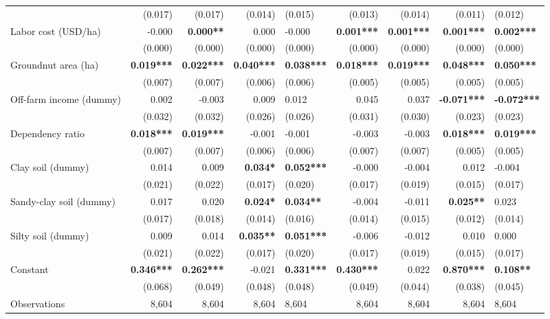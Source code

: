 \documentclass[
]{article}
\begin{document}
\begin{landscape}
\begin{longtable}[t]{lrrrlrrrl}
 & (0.017) & (0.017) & (0.014) & (0.015) & (0.013) & (0.014) & (0.011) & (0.012)\\
Labor cost (USD/ha) & -0.000 & \textbf{0.000**} & 0.000 & -0.000 & \textbf{0.001***} & \textbf{0.001***} & \textbf{0.001***} & \textbf{0.002***}\\
 & (0.000) & (0.000) & (0.000) & (0.000) & (0.000) & (0.000) & (0.000) & (0.000)\\
Groundnut area (ha) & \textbf{0.019***} & \textbf{0.022***} & \textbf{0.040***} & \textbf{0.038***} & \textbf{0.018***} & \textbf{0.019***} & \textbf{0.048***} & \textbf{0.050***}\\
 & (0.007) & (0.007) & (0.006) & (0.006) & (0.005) & (0.005) & (0.005) & (0.005)\\
\addlinespace
Off-farm income (dummy) & 0.002 & -0.003 & 0.009 & 0.012 & 0.045 & 0.037 & \textbf{-0.071***} & \textbf{-0.072***}\\
 & (0.032) & (0.032) & (0.026) & (0.026) & (0.031) & (0.030) & (0.023) & (0.023)\\
Dependency ratio & \textbf{0.018***} & \textbf{0.019***} & -0.001 & -0.001 & -0.003 & -0.003 & \textbf{0.018***} & \textbf{0.019***}\\
 & (0.007) & (0.007) & (0.006) & (0.006) & (0.007) & (0.007) & (0.005) & (0.005)\\
Clay soil (dummy) & 0.014 & 0.009 & \textbf{0.034*} & \textbf{0.052***} & -0.000 & -0.004 & 0.012 & -0.004\\
\addlinespace
 & (0.021) & (0.022) & (0.017) & (0.020) & (0.017) & (0.019) & (0.015) & \vphantom{1} (0.017)\\
Sandy-clay soil (dummy) & 0.017 & 0.020 & \textbf{0.024*} & \textbf{0.034**} & -0.004 & -0.011 & \textbf{0.025**} & 0.023\\
 & (0.017) & (0.018) & (0.014) & (0.016) & (0.014) & (0.015) & (0.012) & (0.014)\\
Silty soil (dummy) & 0.009 & 0.014 & \textbf{0.035**} & \textbf{0.051***} & -0.006 & -0.012 & 0.010 & 0.000\\
 & (0.021) & (0.022) & (0.017) & (0.020) & (0.017) & (0.019) & (0.015) & (0.017)\\
\addlinespace
Constant & \textbf{0.346***} & \textbf{0.262***} & -0.021 & \textbf{0.331***} & \textbf{0.430***} & 0.022 & \textbf{0.870***} & \textbf{0.108**}\\
 & (0.068) & (0.049) & (0.048) & (0.048) & (0.049) & (0.044) & (0.038) & (0.045)\\
\midrule
Observations & 8,604 & 8,604 & 8,604 & 8,604 & 8,604 & 8,604 & 8,604 & 8,604\\

\end{longtable}
\end{landscape}
\end{document}
